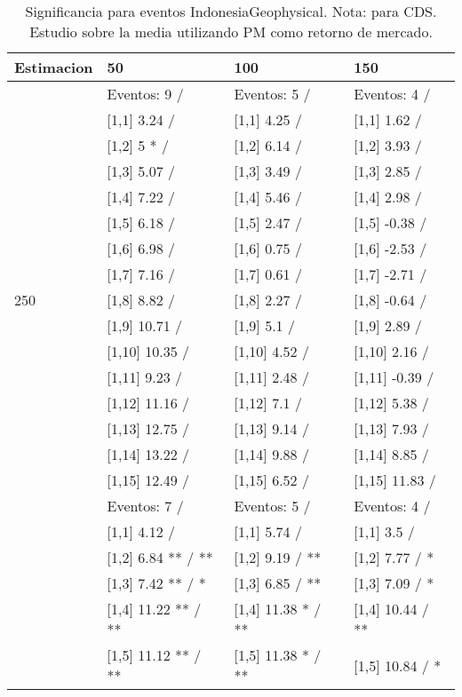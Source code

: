 \begin{table}

\caption{Significancia para eventos IndonesiaGeophysical. Nota: para CDS. Estudio sobre la media utilizando PM como retorno de mercado.}
\centering
\begin{tabular}[t]{llll}
\toprule
Estimacion & 50 & 100 & 150\\
\midrule
 & Eventos:  9 / & Eventos:  5 / & Eventos:  4 /\\
 & {}[1,1] 3.24  / & {}[1,1] 4.25  / & {}[1,1] 1.62  /\\
 & {}[1,2] 5 * / & {}[1,2] 6.14  / & {}[1,2] 3.93  /\\
 & {}[1,3] 5.07  / & {}[1,3] 3.49  / & {}[1,3] 2.85  /\\
 & {}[1,4] 7.22  / & {}[1,4] 5.46  / & {}[1,4] 2.98  /\\
\addlinespace
 & {}[1,5] 6.18  / & {}[1,5] 2.47  / & {}[1,5] -0.38  /\\
 & {}[1,6] 6.98  / & {}[1,6] 0.75  / & {}[1,6] -2.53  /\\
 & {}[1,7] 7.16  / & {}[1,7] 0.61  / & {}[1,7] -2.71  /\\
250 & {}[1,8] 8.82  / & {}[1,8] 2.27  / & {}[1,8] -0.64  /\\
 & {}[1,9] 10.71  / & {}[1,9] 5.1  / & {}[1,9] 2.89  /\\
\addlinespace
 & {}[1,10] 10.35  / & {}[1,10] 4.52  / & {}[1,10] 2.16  /\\
 & {}[1,11] 9.23  / & {}[1,11] 2.48  / & {}[1,11] -0.39  /\\
 & {}[1,12] 11.16  / & {}[1,12] 7.1  / & {}[1,12] 5.38  /\\
 & {}[1,13] 12.75  / & {}[1,13] 9.14  / & {}[1,13] 7.93  /\\
 & {}[1,14] 13.22  / & {}[1,14] 9.88  / & {}[1,14] 8.85  /\\
\addlinespace
 & {}[1,15] 12.49  / & {}[1,15] 6.52  / & {}[1,15] 11.83  /\\
 & Eventos:  7 / & Eventos:  5 / & Eventos:  4 /\\
 & {}[1,1] 4.12  / & {}[1,1] 5.74  / & {}[1,1] 3.5  /\\
 & {}[1,2] 6.84 ** / ** & {}[1,2] 9.19  / ** & {}[1,2] 7.77  / *\\
 & {}[1,3] 7.42 ** / * & {}[1,3] 6.85  / ** & {}[1,3] 7.09  / *\\
\addlinespace
 & {}[1,4] 11.22 ** / ** & {}[1,4] 11.38 * / ** & {}[1,4] 10.44  / **\\
 & {}[1,5] 11.12 ** / ** & {}[1,5] 11.38 * / ** & {}[1,5] 10.84  / *\\

\end{tabular}
\end{table}
